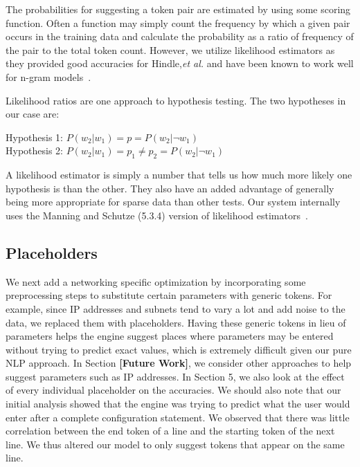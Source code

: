 The probabilities for suggesting a token pair are estimated by using some scoring function. Often a function may simply count the frequency by which a given pair occurs in the training data and calculate the probability as a ratio of frequency of the pair to the total token count. However, we utilize likelihood estimators as they provided good accuracies for Hindle,\textit{et al.} and have been known to work well for n-gram models~\cite{manning}.

Likelihood ratios are one approach to hypothesis testing. The two hypotheses in our case are:

\begin{center}
Hypothesis 1: $P(w_2|w_1) = p = P(w_2|\neg w_1)$ \\
Hypothesis 2: $P(w_2|w_1) = p_1 \neq p_2 = P(w_2|\neg w_1)$	\\	
\end{center}

A likelihood estimator is simply a number that tells us how much more likely one hypothesis is than the other. They also have an added advantage of generally being more appropriate for sparse data than other tests. Our system internally uses the Manning and Schutze (5.3.4) version of likelihood estimators~\cite{manning}.

\subsection{Placeholders}
We next add a networking specific optimization by incorporating some preprocessing steps to substitute certain parameters with generic tokens. For example, since IP addresses and subnets tend to vary a lot and add noise to the data, we replaced them with placeholders. Having these generic tokens in lieu of parameters helps the engine suggest places where parameters may be entered without trying to predict exact values, which is extremely difficult given our pure NLP approach. In Section \textbf{[Future Work]}, we consider other approaches to help suggest parameters such as IP addresses. In Section 5, we also look at the effect of every individual placeholder on the accuracies. We should also note that our initial analysis showed that the engine was trying to predict what the user would enter after a complete configuration statement. We observed that there was little correlation between the end token of a line and the starting token of the next line. We thus altered our model to only suggest tokens that appear on the same line.\\

